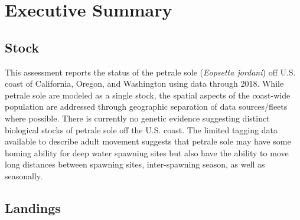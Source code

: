 \documentclass[12pt,]{article}
\begin{document}
\vspace{3cm}



\maketitle


\setcounter{page}{1}

{
\setcounter{tocdepth}{4}
\tableofcontents
}
\setlength{\parskip}{5mm plus1mm minus1mm} \pagebreak

\setcounter{page}{1} \renewcommand{\thefigure}{\alph{figure}}
\renewcommand{\thetable}{\alph{table}}

\section*{Executive Summary}\label{executive-summary}

\subsection*{Stock}\label{stock}

This assessment reports the status of the petrale sole
(\emph{Eopsetta jordani}) off U.S. coast of California, Oregon, and
Washington using data through 2018. While petrale sole are modeled as a
single stock, the spatial aspects of the coast-wide population are
addressed through geographic separation of data sources/fleets where
possible. There is currently no genetic evidence suggesting distinct
biological stocks of petrale sole off the U.S. coast. The limited
tagging data available to describe adult movement suggests that petrale
sole may have some homing ability for deep water spawning sites but also
have the ability to move long distances between spawning sites,
inter-spawning season, as well as seasonally.

\subsection*{Landings}\label{landings}
\end{document}
